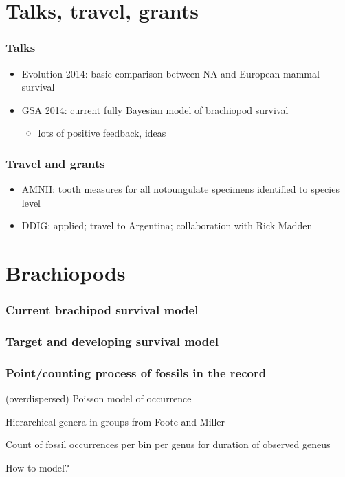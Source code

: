 \documentclass{beamer}
\begin{document}
\begin{frame}
  \tableofcontents
\end{frame}

\section{Talks, travel, grants}
\begin{frame}
  \frametitle{Talks}

  \begin{itemize}
    \item Evolution 2014: basic comparison between NA and European mammal survival 
    \item GSA 2014: current fully Bayesian model of brachiopod survival
      \begin{itemize}
        \item lots of positive feedback, ideas
      \end{itemize}
  \end{itemize}
\end{frame}

\begin{frame}
  \frametitle{Travel and grants}

  \begin{itemize}
    \item AMNH: tooth measures for all notoungulate specimens identified to species level
    \item DDIG: applied; travel to Argentina; collaboration with Rick Madden
  \end{itemize}
\end{frame}


\section{Brachiopods}
\begin{frame}
  \frametitle{Current brachipod survival model}
\end{frame}

\begin{frame}
  \frametitle{Target and developing survival model}
\end{frame}

\begin{frame}
  \frametitle{Point/counting process of fossils in the record}

  (overdispersed) Poisson model of occurrence

  Hierarchical genera in groups from Foote and Miller

  Count of fossil occurrences per bin per genus for duration of observed geneus

  How to model?

\end{frame}
\end{document}
